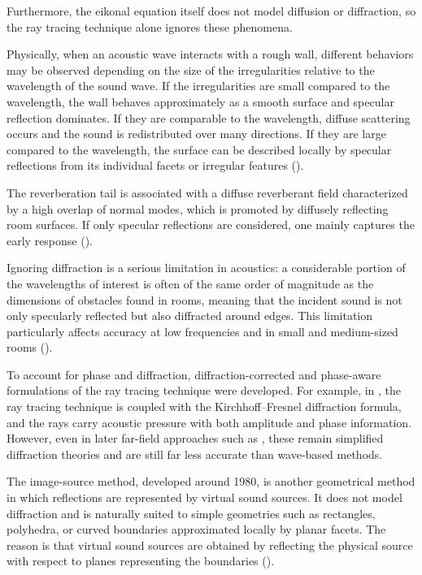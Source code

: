 \documentclass{Configuration_Files/PoliMi3i_thesis}
\begin{document}
Furthermore, the eikonal equation itself does not model diffusion or diffraction, so the ray tracing technique alone ignores these phenomena.

Physically, when an acoustic wave interacts with a rough wall, different behaviors may be observed depending on the size of the irregularities relative to the wavelength of the sound wave. If the irregularities are small compared to the wavelength, the wall behaves approximately as a smooth surface and specular reflection dominates. If they are comparable to the wavelength, diffuse scattering occurs and the sound is redistributed over many directions. If they are large compared to the wavelength, the surface can be described locally by specular reflections from its individual facets or irregular features (\cite{kuttruff_acoustics_2007}).

The reverberation tail is associated with a diffuse reverberant field characterized by a high overlap of normal modes, which is promoted by diffusely reflecting room surfaces. If only specular reflections are considered, one mainly captures the early response (\cite{kuttruff_room_2009}).

Ignoring diffraction is a serious limitation in acoustics: a considerable portion of the wavelengths of interest is often of the same order of magnitude as the dimensions of obstacles found in rooms, meaning that the incident sound is not only specularly reflected but also diffracted around edges. This limitation particularly affects accuracy at low frequencies and in small and medium-sized rooms (\cite{funkhouser_beam_1998,kuttruff_acoustics_2007,kuttruff_room_2009,pind_acoustic_2018}).

To account for phase and diffraction, diffraction-corrected and phase-aware formulations of the ray tracing technique were developed. For example, in \cite{deregowski_theory_1983}, the ray tracing technique is coupled with the Kirchhoff--Fresnel diffraction formula, and the rays carry acoustic pressure with both amplitude and phase information. However, even in later far-field approaches such as \cite{nakagawa_improved_1993}, these remain simplified diffraction theories and are still far less accurate than wave-based methods.

The image-source method, developed around 1980, is another geometrical method in which reflections are represented by virtual sound sources. It does not model diffraction and is naturally suited to simple geometries such as rectangles, polyhedra, or curved boundaries approximated locally by planar facets. The reason is that virtual sound sources are obtained by reflecting the physical source with respect to planes representing the boundaries (\cite{allen_image_1979,borish_extension_1984,kirszenstein_image_1984,heinz_binaural_1993}).
\end{document}
